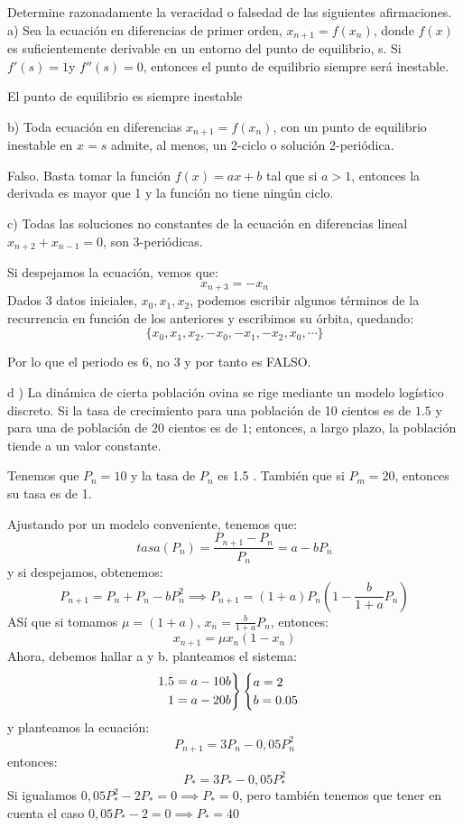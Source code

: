 \documentclass[11pt, a4paper]{article}
\newif\IfInSansMode
\numberwithin{equation}{section}
\theoremstyle{theorem-style}
\theoremstyle{definition-style}
\theoremstyle{remark-style}
\theoremstyle{example-style}
\newenvironment{rcases}
{\left.\begin{aligned}}
    {\end{aligned}\right\rbrace}
\begin{document}
    Determine razonadamente la veracidad o falsedad de las siguientes afirmaciones.
    a) Sea la ecuación en diferencias de primer orden, $x _{n+1} = f (x_n )$, donde $f(x)$ es suficientemente derivable en
    un entorno del punto de equilibrio, s. Si $f'(s) = 1 $y $f'' (s) = 0$, entonces el punto de equilibrio siempre será
    inestable.

    El punto de equilibrio es siempre inestable


    b) Toda ecuación en diferencias $x _{n+1} = f (x_n)$, con un punto de equilibrio inestable en $x = s$ admite, al menos,
    un 2-ciclo o solución 2-periódica.

    Falso. Basta tomar la función $f(x) = ax+b$ tal que si $a>1$, entonces la derivada es mayor que 1 y la función no tiene ningún ciclo.

    c) Todas las soluciones no constantes de la ecuación en diferencias lineal $x_{n+2}+ x_{n-1} = 0$, son 3-periódicas.

    Si despejamos la ecuación, vemos que:
    \[
        x_{n+3} = -x_n
    \]
    Dados 3 datos iniciales, $x_0,x_1,x_2$, podemos escribir algunos términos de la recurrencia en función de los anteriores y escribimos su órbita, quedando:
    \[
        \{x_0,x_1,x_2,-x_0,-x_1,-x_2,x_0,\cdots\}
    \]

    Por lo que el periodo es 6, no 3 y por tanto es FALSO.

    d ) La dinámica de cierta población ovina se rige mediante un modelo logístico discreto. Si la tasa de crecimiento
    para una población de 10 cientos es de $1.5$ y para una de población de 20 cientos es de $1$; entonces, a largo plazo, la población tiende a un valor constante.

    Tenemos que $P_n=10$ y la tasa de $P_n$ es 1.5 . También que si $P_m = 20$, entonces su tasa es de 1.

    Ajustando por un modelo conveniente, tenemos que:
    \[
        tasa(P_n) = \frac{P _{n+1} - P_n}{P_n} = a -bP_n
    \]
    y si despejamos, obtenemos:
    \[
        P _{n+1} = P_n + P_n -b P_n^2 \implies P _{n+1} = (1+a)P_n(1-\frac{b}{1+a}P_n)
    \]
    ASí que si tomamos $\mu = (1+a)$, $x_n = \frac{b}{1+a}P_n$, entonces:
    \[
        x _{n+1} = \mu x_n (1-x_n)
    \]
    Ahora, debemos hallar a y b. planteamos el sistema:
    \[
        \begin{rcases}
            1.5 = a-10b\\
            1 = a-20b
        \end{rcases} 
        \begin{cases}
            a = 2 \\
            b = 0.05
        \end{cases}
    \]
    y planteamos la ecuación:
    \[
        P _{n+1} = 3P_n - 0,05 P_n^2
    \]
    entonces:
    \[
        P_* = 3P_* - 0,05P_*^2
    \]
    Si igualamos $0,05P_*^2 -2P_* = 0 \implies P_* = 0$, pero también tenemos que tener en cuenta el caso $0,05P_* - 2 = 0 \implies P_* = 40$
\end{document}
